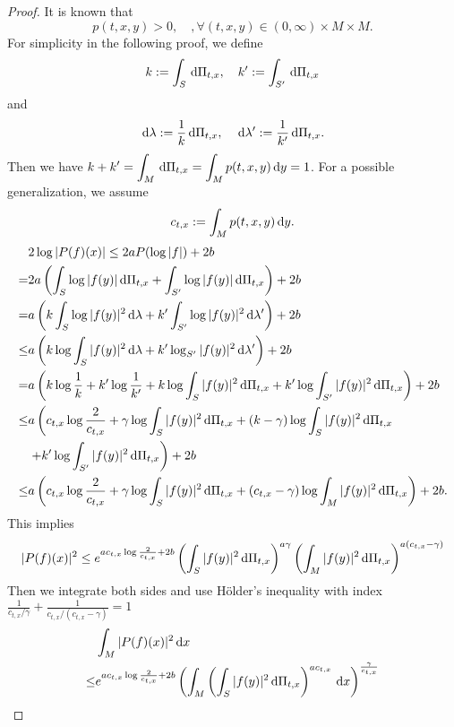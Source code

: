 \begin{proof}
It is known that
\[
p(t,x,y)>0,\quad, \forall (t,x,y)\in (0,\infty)\times M\times M.
\] 
For simplicity in the following proof, we define
\[
k:= \int_{S}\,\mathrm{d}\Pi_{t,x},\quad k':= \int_{S'}\,\mathrm{d}\Pi_{t,x}
\] 
and
\[
\,\mathrm{d}\lambda:=\frac{1}{k}\,\mathrm{d} \Pi_{t,x},\quad \,\mathrm{d} \lambda':= \frac{1}{k'}\,\mathrm{d}\Pi_{t,x}.
\]
Then we have $\displaystyle k+k'=\int_{M} \,\mathrm{d} \Pi_{t,x}=\int_{M} p(t,x,y)\,\mathrm{d} y=1$. For a possible generalization, we assume
\begin{equation}
	c_{t,x}:=\int_{M}p(t,x,y)\,\mathrm{d} y.
\end{equation} 
\begin{align*}
	&2 \log |P(f)(x)|\le 2a P(\log|f|)+2b\\
	=&2a \left( \int_S \log|f(y)|\,\mathrm{d} \Pi_{t,x}+\int_{S'}\log|f(y)|\,\mathrm{d} \Pi_{t,x} \right) +2b\\
	=& a\left(k \int_S\log |f(y)|^2\,\mathrm{d} \lambda+k' \int_{S'} \log|f(y)|^2\,\mathrm{d} \lambda'  \right) +2b\\
	\le & a \left( k \log \int_S|f(y)|^2\,\mathrm{d} \lambda+k' \log_{S'}|f(y)|^2\,\mathrm{d} \lambda' \right)+2b\\
	=& a\left( k\log \frac{1}{k}+k' \log \frac{1}{k'}+k\log \int_S|f(y)|^2\,\mathrm{d} \Pi_{t,x}+k'\log \int_{S'}|f(y)|^2 \,\mathrm{d} \Pi_{t,x} \right)+2b\\
	\le& a \left( c_{t,x} \log \frac{2}{c_{t,x}} + \gamma \log \int_S|f(y)|^2\,\mathrm{d}\Pi_{t,x}+\left( k-\gamma \right) \log \int_S|f(y)|^2\,\mathrm{d}\Pi_{t,x}\right.\\
	   &\left.+k' \log \int_{S'}|f(y)|^2\,\mathrm{d}\Pi_{t,x}  \right)+2b\\
	\le & a\left( c_{t,x} \log \frac{2}{c_{t,x}}+\gamma \log \int_{S}|f(y)|^2\,\mathrm{d}\Pi_{t,x}+\left( c_{t,x}-\gamma \right) \log \int_{M}|f(y)|^2\,\mathrm{d} \Pi_{t,x} \right)+2b
.\end{align*}
This implies
\begin{equation}
	|P(f)(x)|^2\le e^{ac_{t,x} \log \frac{2}{c_{t,x}}+2b}\left(\int_S|f(y)|^2\,\mathrm{d}\Pi_{t,x}\right)^{a\gamma}\left( \int_{M}|f(y)|^2\,\mathrm{d}\Pi_{t,x} \right) ^{a\left( c_{t,x}-\gamma \right) }
\end{equation}
Then we integrate both sides and use Hölder's inequality with index $\displaystyle \frac{1}{c_{t,x} /\gamma}+\frac{1}{c_{t,x} /\left( c_{t,x}-\gamma \right) }=1$ 
\begin{equation}
\begin{aligned}
	&\int_{M}|P(f)(x)|^2\d x\\
		\le & e^{ac_{t,x} \log \frac{2}{c_{t,x}}+2b}\left(\int_{M}\left( \int_{S}|f(y)|^2 \d\Pi_{t,x} \right)^{ac_{t,x}}\d x\right)^{\frac{\gamma}{c_{t,x}}}\\

\end{aligned}
\end{equation}
\end{proof}
